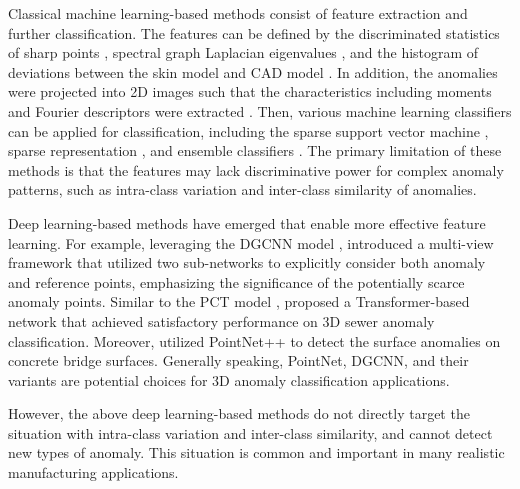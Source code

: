 Classical machine learning-based methods consist of feature extraction and further classification. The features can be defined by the discriminated statistics of sharp points \citep{du2022tensor}, spectral graph Laplacian eigenvalues \citep{samie2017classifying}, and the histogram of deviations between the skin model and CAD model \citep{yacob2019anomaly}. In addition, the anomalies were projected into 2D images such that the characteristics including moments and Fourier descriptors were extracted \citep{madrigal2017method}. Then, various machine learning classifiers can be applied for classification, including the sparse support vector machine \citep{du2022tensor}, sparse representation \citep{samie2017classifying}, and ensemble classifiers \citep{yacob2019anomaly}. The primary limitation of these methods is that the features may lack discriminative power for complex anomaly patterns, such as intra-class variation and inter-class similarity of anomalies.

Deep learning-based methods have emerged that enable more effective feature learning.
For example, leveraging the DGCNN model \citep{wang2019dynamic}, \cite{wang2023mvgcn} introduced a multi-view framework that utilized two sub-networks to explicitly consider both anomaly and reference points, emphasizing the significance of the potentially scarce anomaly points.  Similar to the PCT model \citep{guo2021pct}, \cite{zhou2022sewer} proposed a Transformer-based network that achieved satisfactory performance on 3D sewer anomaly classification. Moreover, \cite{bolourian2023point} utilized PointNet++ to detect the surface anomalies on concrete bridge surfaces. Generally speaking, PointNet, DGCNN, and their variants are potential choices for 3D anomaly classification applications. 

However, the above deep learning-based methods do not directly target the situation with intra-class variation and inter-class similarity, and cannot detect new types of anomaly. This situation is common and important in many realistic manufacturing applications.

